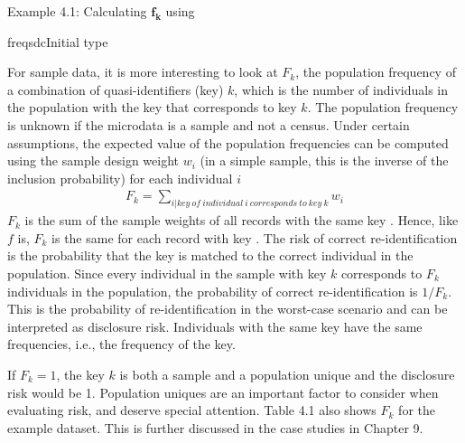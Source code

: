 \documentclass[letterpaper,10pt,english]{sphinxmanual}
\begin{document}
Example 4.1: Calculating \(\mathbf{f}_{\mathbf{k}}\) using 

%
\begin{sphinxVerbatim}[commandchars=\\\{\}]
freqsdcInitial type  
         
\end{sphinxVerbatim}

For sample data, it is more interesting to look at \(F_{k}\), the
population frequency of a combination of quasi-identifiers (key)
\(k\), which is the number of individuals in the population with the
key that corresponds to key \(k\). The population frequency
is unknown if the microdata is a sample and not a census. Under certain
assumptions, the expected value of the population frequencies can be
computed using the sample design weight \(w_{i}\) (in a simple
sample, this is the inverse of the inclusion probability) for each
individual \(i\)
\begin{equation*}
\begin{split}F_{k} = \sum_{i|key\ of\ individual\ i\ corresponds\ to\ key\ k}^{}w_{i}\end{split}
\end{equation*}
\(F_{k}\) is the sum of the sample weights of all records with the
same key . Hence, like \(f\) is, \(F_{k}\) is the same for
each record with key . The risk of correct re-identification is the
probability that the key is matched to the correct individual in the
population. Since every individual in the sample with key \(k\)
corresponds to \(F_{k}\) individuals in the population, the
probability of correct re-identification is \(1/F_{k}.\ \)This is
the probability of re-identification in the worst-case scenario and can
be interpreted as disclosure risk. Individuals with the same key have
the same frequencies, i.e., the frequency of the key.

If \(F_{k} = 1\), the key \(k\) is both a sample and a
population unique and the disclosure risk would be 1. Population uniques
are an important factor to consider when evaluating risk, and deserve
special attention. Table 4.1 also shows \(F_{k}\) for the example
dataset. This is further discussed in the case studies in Chapter 9.
\end{document}
